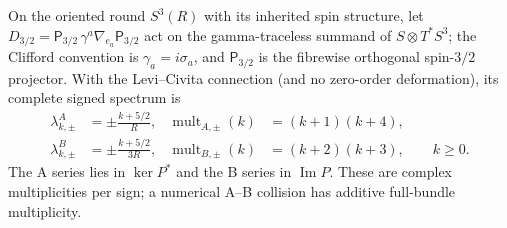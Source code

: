 \documentclass[11pt,a4paper]{article}
\begin{document}
\begin{theorem}
\label{p2f:thm:v260-signed-rs-s3}
On the oriented round $S^3(R)$ with its inherited spin structure, let
$D_{3/2}=\mathsf P_{3/2}\,\gamma^a\nabla_{e_a}\mathsf P_{3/2}$
act on the gamma-traceless summand of $S\otimes T^*S^3$; the
Clifford convention is $\gamma_a=i\sigma_a$, and
$\mathsf P_{3/2}$ is the fibrewise orthogonal spin-$3/2$ projector.
With the Levi--Civita connection (and no zero-order deformation),
its complete signed spectrum is
\[
 \begin{aligned}
 \lambda^{A}_{k,\pm}&=\pm\frac{k+5/2}{R}, &
 \operatorname{mult}_{A,\pm}(k)&=(k+1)(k+4),\\
 \lambda^{B}_{k,\pm}&=\pm\frac{k+5/2}{3R}, &
 \operatorname{mult}_{B,\pm}(k)&=(k+2)(k+3),
 \qquad k\ge0.
 \end{aligned}
\]
The A series lies in $\ker P^*$ and the B series in $\operatorname{Im}P$.
These are complex multiplicities per sign; a numerical A--B collision
has additive full-bundle multiplicity.
\end{theorem}
\end{document}
